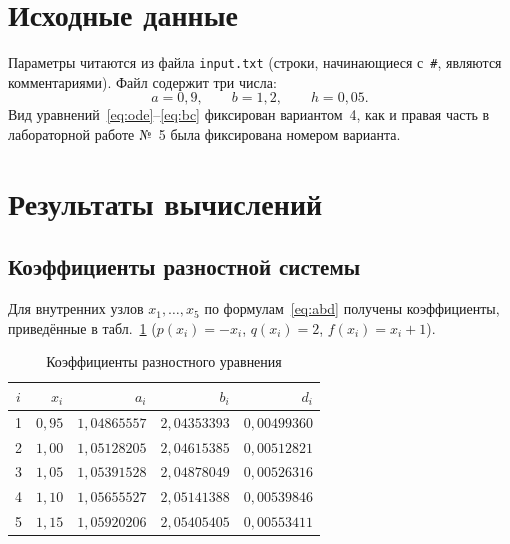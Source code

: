 \documentclass[14pt,a4paper]{extarticle}
\begin{document}
\section{Исходные данные}

Параметры читаются из файла \texttt{input.txt} (строки, начинающиеся
с~\texttt{\#}, являются комментариями). Файл содержит три числа:
\begin{equation}
    a = 0{,}9,\qquad b = 1{,}2,\qquad h = 0{,}05 .
    \label{eq:input}
\end{equation}
Вид уравнений~\eqref{eq:ode}--\eqref{eq:bc} фиксирован вариантом~4,
как и правая часть в лабораторной работе №~5 была фиксирована номером
варианта.

\section{Результаты вычислений}

\subsection{Коэффициенты разностной системы}

Для внутренних узлов $x_1,\ldots,x_5$ по формулам~\eqref{eq:abd}
получены коэффициенты, приведённые в табл.~\ref{tab:abd}
($p(x_i)=-x_i$, $q(x_i)=2$, $f(x_i)=x_i+1$).

\begin{table}[H]
    \centering
    \caption{Коэффициенты разностного уравнения}
    \label{tab:abd}
    \small
    \begin{tabular}{crrrr}
        \toprule
        $i$ & $x_i$ & $a_i$ & $b_i$ & $d_i$\\
        \midrule
        1 & $0{,}95$ & $1{,}04865557$ & $2{,}04353393$ & $0{,}00499360$\\
        2 & $1{,}00$ & $1{,}05128205$ & $2{,}04615385$ & $0{,}00512821$\\
        3 & $1{,}05$ & $1{,}05391528$ & $2{,}04878049$ & $0{,}00526316$\\
        4 & $1{,}10$ & $1{,}05655527$ & $2{,}05141388$ & $0{,}00539846$\\
        5 & $1{,}15$ & $1{,}05920206$ & $2{,}05405405$ & $0{,}00553411$\\
        \bottomrule
    \end{tabular}
\end{table}
\end{document}
